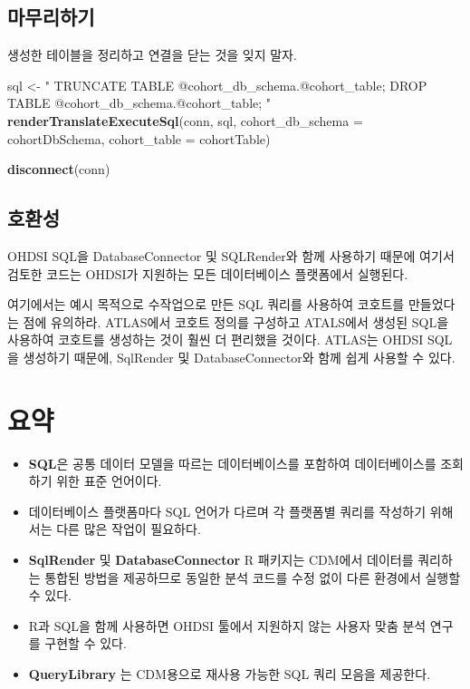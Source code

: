 \documentclass[10.5pt]{book}
\newenvironment{Shaded}{\begin{snugshade}}{\end{snugshade}}
\newcommand{\KeywordTok}[1]{\textcolor[rgb]{0.13,0.29,0.53}{\textbf{#1}}}
\newcommand{\DataTypeTok}[1]{\textcolor[rgb]{0.13,0.29,0.53}{#1}}
\newcommand{\StringTok}[1]{\textcolor[rgb]{0.31,0.60,0.02}{#1}}
\newcommand{\NormalTok}[1]{#1}
\theoremstyle{definition}
\theoremstyle{definition}
\theoremstyle{definition}
\theoremstyle{remark}
\let\BeginKnitrBlock\begin \let\EndKnitrBlock\end
\begin{document}
\subsection{마무리하기}

생성한 테이블을 정리하고 연결을 닫는 것을 잊지 말자.

\begin{Shaded}
\begin{Highlighting}[]
\NormalTok{sql <-}\StringTok{ "}
\StringTok{TRUNCATE TABLE @cohort_db_schema.@cohort_table;}
\StringTok{DROP TABLE @cohort_db_schema.@cohort_table;}
\StringTok{"}
\KeywordTok{renderTranslateExecuteSql}\NormalTok{(conn, sql,}
                          \DataTypeTok{cohort_db_schema =}\NormalTok{ cohortDbSchema,}
                          \DataTypeTok{cohort_table =}\NormalTok{ cohortTable)}

\KeywordTok{disconnect}\NormalTok{(conn)}
\end{Highlighting}
\end{Shaded}

\subsection{호환성}

OHDSI SQL을 DatabaseConnector 및 SQLRender와 함께 사용하기 때문에 여기서
검토한 코드는 OHDSI가 지원하는 모든 데이터베이스 플랫폼에서 실행된다.

여기에서는 예시 목적으로 수작업으로 만든 SQL 쿼리를 사용하여 코호트를
만들었다는 점에 유의하라. ATLAS에서 코호트 정의를 구성하고 ATALS에서
생성된 SQL을 사용하여 코호트를 생성하는 것이 훨씬 더 편리했을 것이다.
ATLAS는 OHDSI SQL을 생성하기 때문에, SqlRender 및 DatabaseConnector와
함께 쉽게 사용할 수 있다.

\section{요약}\label{-7}

\BeginKnitrBlock{rmdsummary}
\begin{itemize}
\item
  \textbf{SQL}은 공통 데이터 모델을 따르는 데이터베이스를 포함하여
  데이터베이스를 조회하기 위한 표준 언어이다.
\item
  데이터베이스 플랫폼마다 SQL 언어가 다르며 각 플랫폼별 쿼리를 작성하기
  위해서는 다른 많은 작업이 필요하다.
\item
  \textbf{SqlRender} 및 \textbf{DatabaseConnector} R 패키지는 CDM에서
  데이터를 쿼리하는 통합된 방법을 제공하므로 동일한 분석 코드를 수정
  없이 다른 환경에서 실행할 수 있다.
\item
  R과 SQL을 함께 사용하면 OHDSI 툴에서 지원하지 않는 사용자 맞춤 분석
  연구를 구현할 수 있다.
\item
  \textbf{QueryLibrary} 는 CDM용으로 재사용 가능한 SQL 쿼리 모음을
  제공한다.
\end{itemize}
\EndKnitrBlock{rmdsummary}
\end{document}
